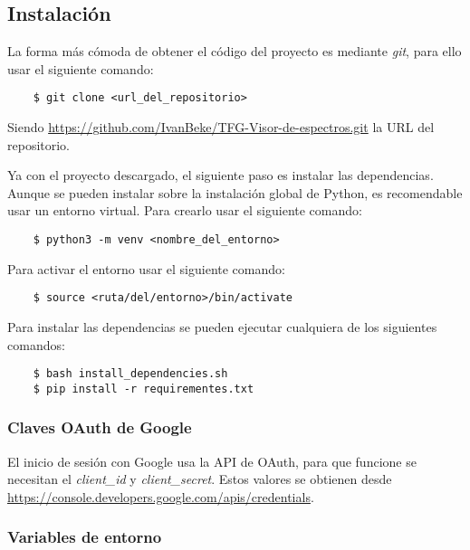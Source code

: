 \subsection{Instalación}

La forma más cómoda de obtener el código del proyecto es mediante \textit{git}, 
para ello usar el siguiente comando:
\begin{lstlisting}
	$ git clone <url_del_repositorio>
\end{lstlisting}
Siendo \url{https://github.com/IvanBeke/TFG-Visor-de-espectros.git} la URL del 
repositorio.

Ya con el proyecto descargado, el siguiente paso es instalar las dependencias. 
Aunque se pueden instalar sobre la instalación global de Python, es 
recomendable usar un entorno virtual. Para crearlo usar el siguiente comando:
\begin{lstlisting}
	$ python3 -m venv <nombre_del_entorno>
\end{lstlisting}
Para activar el entorno usar el siguiente comando:
\begin{lstlisting}
	$ source <ruta/del/entorno>/bin/activate
\end{lstlisting}
Para instalar las dependencias se pueden ejecutar cualquiera de los siguientes 
comandos:
\begin{lstlisting}
	$ bash install_dependencies.sh
	$ pip install -r requirementes.txt
\end{lstlisting}

\subsubsection{Claves OAuth de Google}

El inicio de sesión con Google usa la API de OAuth, para que funcione se 
necesitan el \textit{client\_id} y \textit{client\_secret}. Estos valores se 
obtienen desde \url{https://console.developers.google.com/apis/credentials}.

\subsubsection{Variables de entorno}


